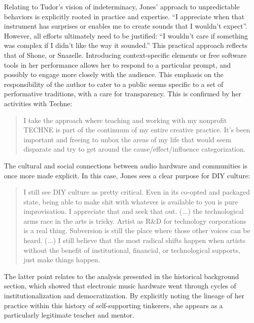 Relating to Tudor's vision of indeterminacy, Jones' approach to unpredictable behaviors is explicitly rooted in practice and expertise. ``I appreciate when that instrument has surprises or enables me to create sounds that I wouldn't expect''. However, all efforts ultimately need to be justified: ``I wouldn't care if something was complex if I didn't like the way it sounded.'' This practical approach reflects that of Shone, or Snazelle. Introducing context-specific elements or free software tools in her performance allows her to respond to a particular prompt, and possibly to engage more closely with the audience. This emphasis on the responsibility of the author to cater to a public seems specific to a set of performative traditions, with a care for transparency. This is confirmed by her activities with Techne: 

\begin{quote}
	I take the approach where teaching and working with my nonprofit TECHNE is part of the continuum of my entire creative practice. It’s been important and freeing to unbox the areas of my life that would seem disparate and try to get around the cause/effect/influence categorization.
\end{quote}

The cultural and social connections between audio hardware and communities is once more made explicit. In this case, Jones sees a clear purpose for DIY culture: 

\begin{quote}
	I still see DIY culture as pretty critical. Even in its co-opted and packaged state, being able to make shit with whatever is available to you is pure improvisation. I appreciate that and seek that out. (...) the technological arms race in the arts is tricky. Artist as R\&D for technology corporations is a real thing. Subversion is still the place where those other voices can be heard. (...) I still believe that the most radical shifts happen when artists without the benefit of institutional, financial, or technological supports, just make things happen.
\end{quote}

The latter point relates to the analysis presented in the historical background section, which showed that electronic music hardware went through cycles of institutionalization and democratization. By explicitly noting the lineage of her practice within this history of self-supporting tinkerers, she appears as a particularly legitimate teacher and mentor. 


